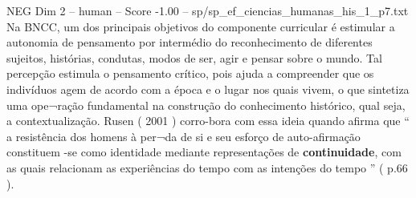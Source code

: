 \begin{textsample}{NEG Dim 2 – human – Score -1.00 – sp/sp\_ef\_ciencias\_humanas\_his\_1\_p7.txt}  \label{ex:f2_neg_005}
Na BNCC, um dos principais objetivos do componente curricular é estimular a autonomia de pensamento por intermédio do reconhecimento de diferentes sujeitos, histórias, condutas, modos de ser, agir e pensar sobre o mundo.
Tal percepção estimula o pensamento crítico, pois ajuda a compreender que os indivíduos agem de acordo com a época e o lugar nos quais vivem, o que sintetiza uma ope¬ração fundamental na construção do conhecimento histórico, qual seja, a contextualização.
Rusen ( 2001 ) corro-bora com essa ideia quando afirma que “ a resistência dos homens à per¬da de si e seu esforço de auto-afirmação constituem -se como identidade mediante representações de \textbf{continuidade}, com as quais relacionam as experiências do tempo com as intenções do tempo ” ( p.66 ).

\end{textsample}
